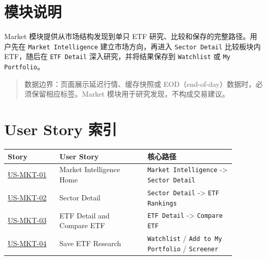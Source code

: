 \section{模块说明}
Market 模块提供从市场结构发现到单只 ETF 研究、比较和保存的完整路径。用户先在 \texttt{Market Intelligence} 建立市场方向，再进入 \texttt{Sector Detail} 比较板块内 ETF，随后在 \texttt{ETF Detail} 深入研究，并将结果保存到 \texttt{Watchlist} 或 \texttt{My Portfolio}。
\begin{quote}\small 数据边界：页面展示延迟行情、缓存快照或 EOD（end-of-day）数据时，必须保留相应标签。Market 模块用于研究发现，不构成交易建议。\end{quote}
\section{User Story 索引}
\begingroup
\small
\begin{longtable}{L{0.20\linewidth}L{0.34\linewidth}L{0.34\linewidth}}
\toprule
\textbf{Story} & \textbf{User Story} & \textbf{核心路径} \\
\midrule
\hyperlink{us-mkt-01}{US-MKT-01} & Market Intelligence Home & \texttt{Market Intelligence} -\textgreater{} \texttt{Sector Detail} \\
\hyperlink{us-mkt-02}{US-MKT-02} & Sector Detail & \texttt{Sector Detail} -\textgreater{} \texttt{ETF Rankings} \\
\hyperlink{us-mkt-03}{US-MKT-03} & ETF Detail and Compare ETF & \texttt{ETF Detail} -\textgreater{} \texttt{Compare ETF} \\
\hyperlink{us-mkt-04}{US-MKT-04} & Save ETF Research & \texttt{Watchlist} /\allowbreak{} \texttt{Add to My Portfolio} /\allowbreak{} \texttt{Screener} \\
\bottomrule
\end{longtable}
\endgroup
